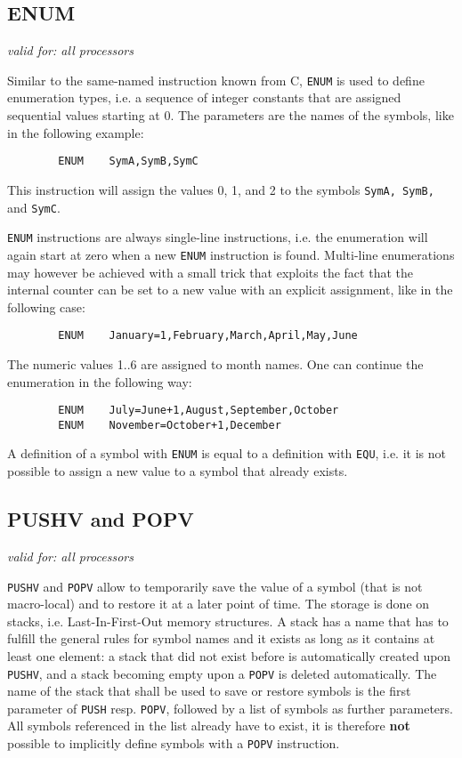 \documentclass[12pt,twoside]{report}
\makeatletter
\newcommand{\bb}[1]{{\bf #1}}
\newcommand{\tty}[1]{{\tt #1}}
\newcommand{\ttindex}[1]{\index{#1@{\tt #1}}}
\makeatother
\begin{document}
\subsection{ENUM}
\ttindex{ENUM}

{\em valid for: all processors}

Similar to the same-named instruction known from C, \tty{ENUM} is used to
define enumeration types, i.e. a sequence of integer constants that
are assigned sequential values starting at 0.  The parameters are the
names of the symbols, like in the following example:
\begin{verbatim}
        ENUM    SymA,SymB,SymC
\end{verbatim}
This instruction will assign the values 0, 1, and 2 to the symbols
\tty{SymA, SymB,} and \tty{SymC}.

\tty{ENUM} instructions are always single-line instructions, i.e. the
enumeration will again start at zero when a new \tty{ENUM} instruction is
found.  Multi-line enumerations may however be achieved with a small trick
that exploits the fact that the internal counter can be set to a new value
with an explicit assignment, like in the following case:
\begin{verbatim}
        ENUM    January=1,February,March,April,May,June
\end{verbatim}
The numeric values 1..6 are assigned to month names.  One can
continue the enumeration in the following way:
\begin{verbatim}
        ENUM    July=June+1,August,September,October
        ENUM    November=October+1,December
\end{verbatim}
A definition of a symbol with \tty{ENUM} is equal to a definition with
\tty{EQU}, i.e. it is not possible to assign a new value to a symbol that
already exists.


\subsection{PUSHV and POPV}
\ttindex{PUSHV}\ttindex{POPV}

{\em valid for: all processors}

\tty{PUSHV} and \tty{POPV} allow to temporarily save the value of a symbol
(that is not macro-local) and to restore it at a later point of time.  The
storage is done on stacks, i.e. Last-In-First-Out memory structures.  A
stack has a name that has to fulfill the general rules for symbol names
and it exists as long as it contains at least one element: a stack that
did not exist before is automatically created upon \tty{PUSHV}, and a
stack becoming empty upon a \tty{POPV} is deleted automatically.  The name
of the stack that shall be used to save or restore symbols is the first
parameter of \tty{PUSH} resp. \tty{POPV}, followed by a list of symbols as
further parameters.  All symbols referenced in the list already have to
exist, it is therefore \bb{not} possible to implicitly define symbols with
a \tty{POPV} instruction.
\end{document}
